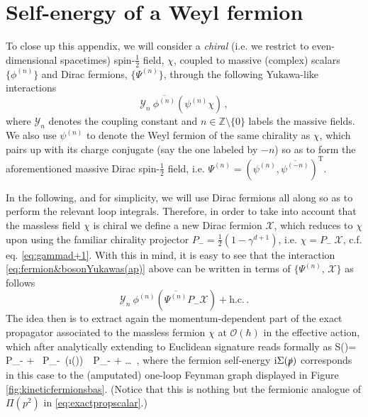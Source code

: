 \section{Self-energy of a Weyl fermion}
\label{ap:LoopsWeylfermion}
	
To close up this appendix, we will consider a \emph{chiral} (i.e. we restrict to even-dimensional spacetimes) spin-$\frac{1}{2}$ field, $\chi$, coupled to massive (complex) scalars $\{\phi^{(n)}\}$ and Dirac fermions, $\{\Psi^{(n)}\}$, through the following Yukawa-like interactions
%
\begin{equation}\label{eq:fermion&bosonYukawas(ap)}
			\mathcal{Y}_n\ \overline{\phi^{(n)}} \left(\psi^{(n)}\chi \right)\, ,  
\end{equation}
%
where $\mathcal{Y}_n$ denotes the coupling constant and $n \in \mathbb{Z} \setminus \lbrace0\rbrace$ labels the massive fields. We also use $\psi^{(n)}$ to denote the Weyl fermion of the same chirality as $\chi$, which pairs up with its charge conjugate (say the one labeled by $-n$) so as to form the aforementioned massive Dirac spin-$\frac{1}{2}$ field, i.e. $\Psi^{(n)}=\left(\psi^{(n)}, \overline{\psi^{(-n)}} \right)^{\text{T}}$. 
		
In the following, and for simplicity, we will use Dirac fermions all along so as to perform the relevant loop integrals. Therefore, in order to take into account that the massless field $\chi$ is chiral we define a new Dirac fermion $\mathcal{X}$, which reduces to $\chi$ upon using the familiar chirality projector $P_{-}=\frac{1}{2}(1-\gamma^{d+1})$, i.e. $\chi = P_{-}\ \mathcal{X}$, c.f. eq. \eqref{eq:gammad+1}. With this in mind, it is easy to see that the interaction \eqref{eq:fermion&bosonYukawas(ap)} above can be written in terms of $\{\Psi^{(n)},\, \mathcal{X}\}$ as follows
%
\begin{equation}\label{eq:interactionsfermion2(ap)}
			\mathcal{Y}_n\ \phi^{(n)} \left( \overline{\Psi^{(n)}} P_{-} \mathcal{X} \right) + \text{h.c.}\, .  
\end{equation}
%
The idea then is to extract again the momentum-dependent part of the exact propagator associated to the massless fermion $\chi$ at $\mathcal{O}(\hbar)$ in the effective action, which after analytically extending to Euclidean signature reads formally as
%
\beq\label{eq:Euclexactpropagator(ap)}
		S()= \, P_{-} + \, P_{-}\, \left(\i \Sigma()\right)\, \, P_{-} + \ldots\, ,
\eeq
%
where the fermion self-energy $\text{i} \Sigma(\slashed{p})$ corresponds in this case to the (amputated) one-loop Feynman graph displayed in Figure \ref{fig:kineticfermionsbas}. (Notice that this is nothing but the fermionic analogue of $\Pi(p^2)$ in \eqref{eq:exactpropscalar}.) 
		

